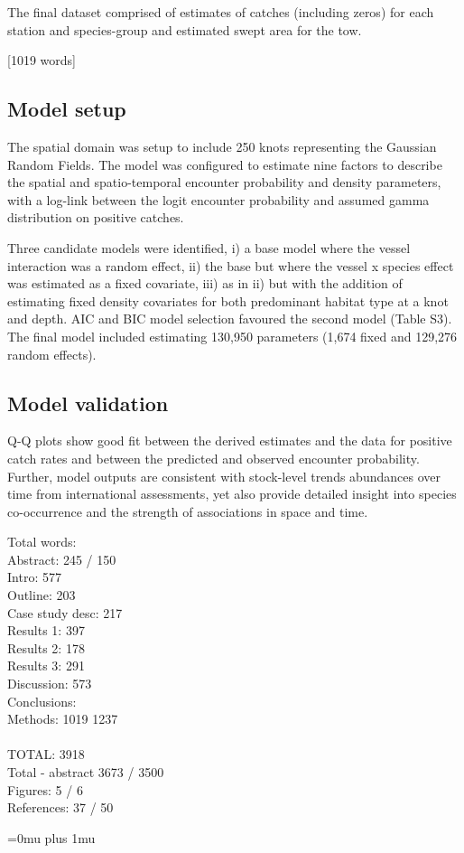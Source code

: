 \documentclass{nature}
\begin{document}
\begin{linenumbers}
The final dataset comprised of estimates of catches (including zeros) for each
station and species-group and estimated swept area for the tow.

[1019 words]

\subsection{Model setup}

The spatial domain was setup to include 250 knots representing the Gaussian
Random Fields. The model was configured to estimate nine factors to describe
the spatial and spatio-temporal encounter probability and density parameters,
with a log-link between the logit encounter probability and assumed gamma
distribution on positive catches.

Three candidate models were identified, i) a base model where the vessel
interaction was a random effect, ii) the base but where the vessel x species
effect was estimated as a fixed covariate, iii) as in ii) but with the addition
of estimating fixed density covariates for both predominant habitat type at a
knot and depth. AIC and BIC model selection favoured the second model (Table
S3). The final model included estimating 130,950 parameters (1,674 fixed and
129,276 random effects).

\subsection{Model validation}

Q-Q plots show good fit between the derived estimates and the data for positive
catch rates and between the predicted and observed encounter probability.
Further, model outputs are consistent with stock-level trends abundances over time
from international assessments, yet also provide detailed insight into species
co-occurrence and the strength of associations in space and time. 

Total words: \\
Abstract:	 	  245  / 150 \\
Intro:   		  577  \\
Outline:		  203 \\
Case study desc:	  217 \\
Results 1:		  397 \\
Results 2:		  178 \\
Results 3:		  291 \\
Discussion:	          573 \\
Conclusions:	              \\
Methods:		 1019 1237 \\
\\
TOTAL:			 3918 \\
Total - abstract         3673 / 3500 \\

Figures: 5 / 6 \\
References: 37 / 50 \\

\end{linenumbers}
\newpage
\Urlmuskip=0mu plus 1mu\relax

\small{}
\end{document}
